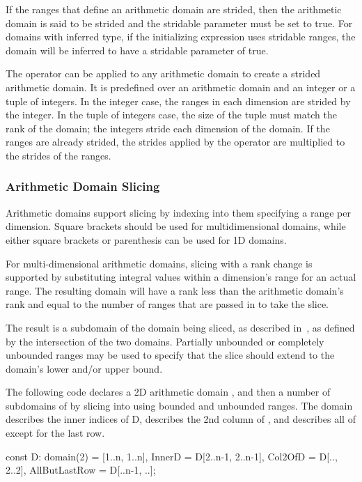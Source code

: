 If the ranges that define an arithmetic domain are strided, then the
arithmetic domain is said to be strided and the stridable parameter
must be set to true.  For domains with inferred type, if the
initializing expression uses stridable ranges, the domain will be
inferred to have a stridable parameter of true.

The  operator can be applied to any arithmetic domain to
create a strided arithmetic domain.  It is predefined over an
arithmetic domain and an integer or a tuple of integers.  In the
integer case, the ranges in each dimension are strided by the integer.
In the tuple of integers case, the size of the tuple must match the
rank of the domain; the integers stride each dimension of the domain.
If the ranges are already strided, the strides applied by
the  operator are multiplied to the strides of the ranges.

\subsubsection{Arithmetic Domain Slicing}
\label{Arithmetic_Domain_Slicing}

Arithmetic domains support slicing by indexing into them specifying a
range per dimension.  Square brackets should be used for
multidimensional domains, while either square brackets or parenthesis
can be used for 1D domains.  

For multi-dimensional arithmetic domains, slicing with a rank change
is supported by substituting integral values within a dimension's
range for an actual range.  The resulting domain will have a rank less
than the arithmetic domain's rank and equal to the number of ranges
that are passed in to take the slice.

The result is a subdomain of the domain being sliced, as described
in~, as defined by the intersection of the two
domains.  Partially unbounded or completely unbounded ranges may be
used to specify that the slice should extend to the domain's lower
and/or upper bound.

\begin{example}
The following code declares a 2D arithmetic domain , and then
a number of subdomains of  by slicing into  using
bounded and unbounded ranges.  The  domain describes the
inner indices of D,  describes the 2nd column of
, and  describes all of  except
for the last row.

\begin{chapel}
const D: domain(2) = [1..n, 1..n],
      InnerD = D[2..n-1, 2..n-1],
      Col2OfD = D[.., 2..2],
      AllButLastRow = D[..n-1, ..];
\end{chapel}
\end{example}


